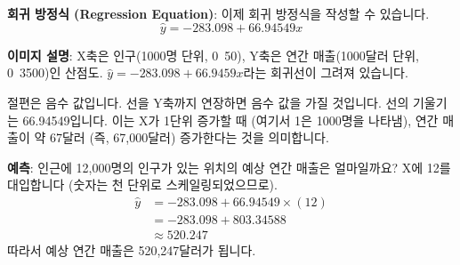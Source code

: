 \documentclass[11pt,a4paper]{book}
\theoremstyle{definition}
\begin{document}
\begin{tcolorbox}[examplebox, title={예시: 연간 매출과 인구 규모}]
\textbf{회귀 방정식 (Regression Equation)}:
이제 회귀 방정식을 작성할 수 있습니다.
\begin{equation*}
\hat{y} = -283.098 + 66.94549x
\end{equation*}

\begin{center}
\end{center}
\textbf{이미지 설명}: X축은 인구(1000명 단위, 0~50), Y축은 연간 매출(1000달러 단위, 0~3500)인 산점도. $\hat{y} = -283.098 + 66.9459x$라는 회귀선이 그려져 있습니다.

절편은 음수 값입니다. 선을 Y축까지 연장하면 음수 값을 가질 것입니다. 선의 기울기는 66.94549입니다. 이는 X가 1단위 증가할 때 (여기서 1은 1000명을 나타냄), 연간 매출이 약 67달러 (즉, 67,000달러) 증가한다는 것을 의미합니다.

\textbf{예측}: 인근에 12,000명의 인구가 있는 위치의 예상 연간 매출은 얼마일까요?
X에 12를 대입합니다 (숫자는 천 단위로 스케일링되었으므로).
\begin{align*}
\hat{y} &= -283.098 + 66.94549 \times (12) \\
&= -283.098 + 803.34588 \\
&\approx 520.247
\end{align*}
따라서 예상 연간 매출은 520,247달러가 됩니다.
\end{tcolorbox}
\end{document}
